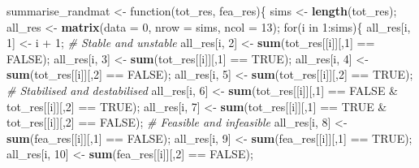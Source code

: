 \documentclass[]{article}
\newenvironment{Shaded}{\begin{snugshade}}{\end{snugshade}}
\newcommand{\KeywordTok}[1]{\textcolor[rgb]{0.13,0.29,0.53}{\textbf{{#1}}}}
\newcommand{\DataTypeTok}[1]{\textcolor[rgb]{0.13,0.29,0.53}{{#1}}}
\newcommand{\DecValTok}[1]{\textcolor[rgb]{0.00,0.00,0.81}{{#1}}}
\newcommand{\StringTok}[1]{\textcolor[rgb]{0.31,0.60,0.02}{{#1}}}
\newcommand{\CommentTok}[1]{\textcolor[rgb]{0.56,0.35,0.01}{\textit{{#1}}}}
\newcommand{\OtherTok}[1]{\textcolor[rgb]{0.56,0.35,0.01}{{#1}}}
\newcommand{\NormalTok}[1]{{#1}}
\begin{document}
\begin{Shaded}
\begin{Highlighting}[]
\NormalTok{summarise_randmat <-}\StringTok{ }\NormalTok{function(tot_res, fea_res)\{}
    \NormalTok{sims    <-}\StringTok{ }\KeywordTok{length}\NormalTok{(tot_res);}
    \NormalTok{all_res <-}\StringTok{ }\KeywordTok{matrix}\NormalTok{(}\DataTypeTok{data =} \DecValTok{0}\NormalTok{, }\DataTypeTok{nrow =} \NormalTok{sims, }\DataTypeTok{ncol =} \DecValTok{13}\NormalTok{);}
    \NormalTok{for(i in }\DecValTok{1}\NormalTok{:sims)\{}
        \NormalTok{all_res[i, }\DecValTok{1}\NormalTok{]  <-}\StringTok{ }\NormalTok{i +}\StringTok{ }\DecValTok{1}\NormalTok{;}
        \CommentTok{# Stable and unstable}
        \NormalTok{all_res[i, }\DecValTok{2}\NormalTok{]  <-}\StringTok{ }\KeywordTok{sum}\NormalTok{(tot_res[[i]][,}\DecValTok{1}\NormalTok{] ==}\StringTok{ }\OtherTok{FALSE}\NormalTok{);}
        \NormalTok{all_res[i, }\DecValTok{3}\NormalTok{]  <-}\StringTok{ }\KeywordTok{sum}\NormalTok{(tot_res[[i]][,}\DecValTok{1}\NormalTok{] ==}\StringTok{ }\OtherTok{TRUE}\NormalTok{);}
        \NormalTok{all_res[i, }\DecValTok{4}\NormalTok{]  <-}\StringTok{ }\KeywordTok{sum}\NormalTok{(tot_res[[i]][,}\DecValTok{2}\NormalTok{] ==}\StringTok{ }\OtherTok{FALSE}\NormalTok{);}
        \NormalTok{all_res[i, }\DecValTok{5}\NormalTok{]  <-}\StringTok{ }\KeywordTok{sum}\NormalTok{(tot_res[[i]][,}\DecValTok{2}\NormalTok{] ==}\StringTok{ }\OtherTok{TRUE}\NormalTok{);}
        \CommentTok{# Stabilised and destabilised}
        \NormalTok{all_res[i, }\DecValTok{6}\NormalTok{] <-}\StringTok{ }\KeywordTok{sum}\NormalTok{(tot_res[[i]][,}\DecValTok{1}\NormalTok{] ==}\StringTok{ }\OtherTok{FALSE} \NormalTok{&}\StringTok{ }
\StringTok{                                  }\NormalTok{tot_res[[i]][,}\DecValTok{2}\NormalTok{] ==}\StringTok{ }\OtherTok{TRUE}\NormalTok{);}
        \NormalTok{all_res[i, }\DecValTok{7}\NormalTok{] <-}\StringTok{ }\KeywordTok{sum}\NormalTok{(tot_res[[i]][,}\DecValTok{1}\NormalTok{] ==}\StringTok{ }\OtherTok{TRUE} \NormalTok{&}\StringTok{ }
\StringTok{                                  }\NormalTok{tot_res[[i]][,}\DecValTok{2}\NormalTok{] ==}\StringTok{ }\OtherTok{FALSE}\NormalTok{);}
        \CommentTok{# Feasible and infeasible}
        \NormalTok{all_res[i, }\DecValTok{8}\NormalTok{]  <-}\StringTok{ }\KeywordTok{sum}\NormalTok{(fea_res[[i]][,}\DecValTok{1}\NormalTok{] ==}\StringTok{ }\OtherTok{FALSE}\NormalTok{);}
        \NormalTok{all_res[i, }\DecValTok{9}\NormalTok{]  <-}\StringTok{ }\KeywordTok{sum}\NormalTok{(fea_res[[i]][,}\DecValTok{1}\NormalTok{] ==}\StringTok{ }\OtherTok{TRUE}\NormalTok{);}
        \NormalTok{all_res[i, }\DecValTok{10}\NormalTok{]  <-}\StringTok{ }\KeywordTok{sum}\NormalTok{(fea_res[[i]][,}\DecValTok{2}\NormalTok{] ==}\StringTok{ }\OtherTok{FALSE}\NormalTok{);}

\end{Highlighting}
\end{Shaded}
\end{document}
